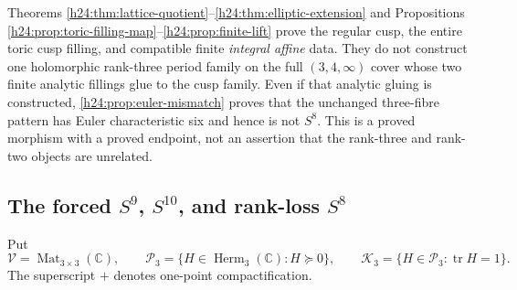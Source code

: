 \begin{remark}
Theorems \ref{h24:thm:lattice-quotient}--\ref{h24:thm:elliptic-extension} and
Propositions \ref{h24:prop:toric-filling-map}--\ref{h24:prop:finite-lift} prove the
regular cusp, the entire toric cusp filling, and compatible finite
\emph{integral affine} data.  They do not construct one holomorphic
rank-three period family on the full $(3,4,\infty)$ cover whose two finite
analytic fillings glue to the cusp family.  Even if that analytic gluing is
constructed, \cref{h24:prop:euler-mismatch} proves that the unchanged
three-fibre pattern has Euler characteristic six and hence is not $S^8$.
This is a proved morphism with a proved endpoint, not an assertion that the
rank-three and rank-two objects are unrelated.
\end{remark}

\subsection[The forced S9, S10, and rank-loss S8]
{The forced $S^9$, $S^{10}$, and rank-loss $S^8$}
\label{h24:sec:sphere-ladder}

Put
\[
 \mathscr V=\operatorname{Mat}_{3\times3}(\mathbb C),\qquad
 \mathcal P_3=\{H\in\operatorname{Herm}_3(\mathbb C):H\succeq0\},\qquad
 \mathcal K_3=\{H\in\mathcal P_3:\operatorname{tr} H=1\}.
\]
The superscript $+$ denotes one-point compactification.


